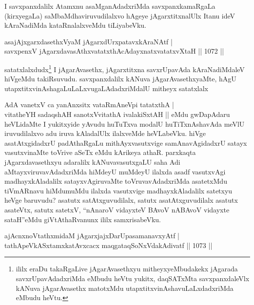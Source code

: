 \begin{artha}
I savxpanxdalilx Atamxnu asaMganAdadxriMda savxpanxkamaRgaLa (kirxyegaLa) saMbaMdhaviruvudilalxvo hAgeye jAgarxtitxnalUlx Itanu ideV kAraNadiMda kataRnalalxveMdu tiLiyabeVku.
\end{artha}

\begin{shl}
asajAjxgarxdasethxVyaM jAgarxdUrxpatavxkAraNAtf | \\
savxpenxV jAgarxdavasAthxvatatxthAcA\s \s dayxnatxvatatxvXtaH \hfill||  1072 ||  
\end{shl}

\begin{artha}
satatxlalxdudx\footnote{ililx eraDu takaRgaLive jAgarAvasethxyu mitheyxyeMbudakekx jAgarada savxrUpavAdadxriMda eMbudu heVtu yukitx, daqSATxMta savxpanxdaleVlx kANuva jAgarAvasethx matotxMdu utapxtitxvinAshavuLaLxdadxriMda eMbudu heVtu.} I jAgarAvasethx, jAgarxtitxna savxrUpavAda kAraNadiMdaleV hiVgeMdu takiRsuvudu. savxpanxdalilx kANuva jAgarAvasethxyaMte, hAgU utapxtitxvinAshagaLuLaLxvugaLAdadxriMdalU mitheyx satatxlalx
\end{artha}

\begin{artha}
AdA vanetxV ca yanAnxsitx vataRmAneV\s pi tatatxthA |\\
vitatheYH sadaqshAH sanotxV\s vitathA ivalakiSxtAH ||
eMdu gwDapAdaru heVLidaMte I yukitxyide yAvudu huTuTxva modalU huTiTxnAshavAda meVlU iruvudilalxvo adu  iruva kAladalUlx ilalxveMde heVLabeVku. hiVge asatAtxgidadxrU padAthaRgaLu mithAyxvasutxvige samAnavAgidadxrU satayx vasutxvinaMte toVrive aSeTx eMdu kArikeya athaR. parxkaqta jAgarxdavasethxyu adaralilx kANuvavasutxgaLU saha Adi aMtayxviruvavAdadxriMda hiMdeyU muMdeyU ilalxda asadf vasutxvAgi madhayxkAladalilx satayxvAgiruvaMte toVruvavAdadxriMda asatetxMdu tiVmARnavu hiMdumuMdu ilalxda vasutxvige madhayxkAladalilx satetxyu heVge baruvudu? asatutx satAtxguvudilalx, satutx asatAtxguvudilalx asatutx asateVtx, satutx satetxV, ``nAnaroV vidayxteV BAvoV nABAvoV vidayxte sataH''eMdu giVtAthaRvanunx ililx samxrisabeVku.
\end{artha}


\begin{shl}
ajAcnxnoVtathxmidaM jAgarxjajxDarUpasamanavxyAtf | \\
tathA\s peVkASxtamxkatAvxcacx maqgataqSoNxVdakAdivatf \hfill||  1073 ||  
\end{shl}

